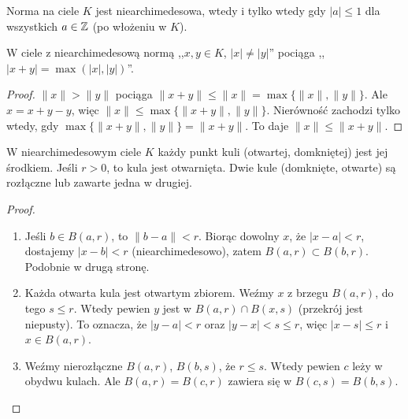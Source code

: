 \begin{fakt}
	Norma na ciele $K$ jest niearchimedesowa, wtedy i tylko wtedy gdy $|a| \le 1$ dla wszystkich $a \in \mathbb{Z}$ (po włożeniu w $K$).
\end{fakt}

\begin{fakt}
	W ciele z niearchimedesową normą ,,$x, y \in K$, $|x| \neq |y|$'' pociąga ,,$|x+y| = \max (|x|, |y|)$''.
\end{fakt}

\begin{proof}
	$\|x\| > \|y\|$ pociąga $\|x+y\| \le \|x\| = \max\{\|x\|,\|y\|\}$.
	Ale $x = x+y-y$, więc $\|x\| \le \max \{\|x+y\|, \|y\|\}$.
	Nierówność zachodzi tylko wtedy, gdy $\max\{\|x+y\|, \|y\|\} = \|x+y\|$.
	To daje $\|x\| \le \|x+y\|$.
\end{proof}

\begin{fakt}
	W niearchimedesowym ciele $K$ każdy punkt kuli (otwartej, domkniętej) jest jej środkiem.
	Jeśli $ r > 0$, to kula jest otwarnięta.
	Dwie kule (domknięte, otwarte) są rozłączne lub zawarte jedna w drugiej.
\end{fakt}

\begin{proof}
	\begin{enumerate}
		\item Jeśli $b \in B(a, r)$, to $\|b-a\| < r$. Biorąc dowolny $x$, że $|x-a| < r$, dostajemy $|x-b| < r$ (niearchimedesowo), zatem $B(a,r) \subset B(b,r)$. Podobnie w drugą stronę.
		\item Każda otwarta kula jest otwartym zbiorem. Weźmy $x$ z brzegu $B(a,r)$, do tego $s \le r$. Wtedy pewien $y$ jest w $B(a,r) \cap B(x,s)$ (przekrój jest niepusty). To oznacza, że $|y-a| < r$ oraz $|y - x| < s \le r$, więc $|x-s| \le r$ i $x \in B(a,r)$.
		\item Weźmy nierozłączne $B(a,r)$, $B(b,s)$, że $r \le s$. Wtedy pewien $c$ leży w obydwu kulach. Ale $B(a,r) = B(c,r)$ zawiera się w $B(c,s) = B(b,s)$. \qedhere
	\end{enumerate}
\end{proof}